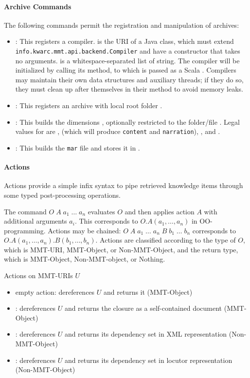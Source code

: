 \paragraph{Archive Commands}
The following commands permit the registration and manipulation of archives:

\begin{itemize}
\item {}: This registers a compiler.  is the URI of a Java class, which must extend \texttt{info.kwarc.mmt.api.backend.Compiler} and have a constructor that takes no arguments.  is a whitespace-separated list of string. The compiler will be initialized by calling its  method, to which  is passed as a Scala . Compilers may maintain their own data structures and auxiliary threads; if they do so, they must clean up after themselves in their  method to avoid memory leaks.
\item {}: This registers an archive with local root folder .
\item {}: This builds the dimensions , optionally restricted to the folder/file . Legal values for  are ,  (which will produce \texttt{content} and \texttt{narration}), , and .
\item {}: This builds the \texttt{mar} file and stores it in .
\end{itemize}

\paragraph{Actions}
Actions provide a simple infix syntax to pipe retrieved knowledge items through some typed post-processing operations.

The command $O\;A\;a_1\;\ldots\;a_n$ evaluates $O$ and then applies action $A$ with additional arguments $a_i$. This corresponds to $O.A(a_1,\ldots,a_n)$ in OO-programming. Actions may be chained: $O\;A\;a_1\;\ldots\;a_n \;B\;b_1\;\ldots\;b_n$ corresponds to $O.A(a_1,\ldots,a_n).B(b_1,\ldots,b_n)$. Actions are classified according to the type of $O$, which is MMT-URI, MMT-Object, or Non-MMT-Object, and the return type, which is MMT-Object, Non-MMT-object, or Nothing.
\smallskip

\noindent
Actions on MMT-URIs $U$
\begin{itemize}
\item empty action: dereferences $U$ and returns it (MMT-Object)
\item {}: dereferences $U$ and returns the closure as a self-contained document (MMT-Object)
\item {}: dereferences $U$ and returns its dependency set in XML representation (Non-MMT-Object)
\item {}: dereferences $U$ and returns its dependency set in locutor representation (Non-MMT-Object)
\end{itemize}

